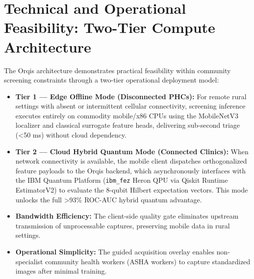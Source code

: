 \documentclass[11pt,a4paper]{report}
\begin{document}
\section{Technical and Operational Feasibility: Two-Tier Compute Architecture}
The Orqis architecture demonstrates practical feasibility within community screening constraints through a two-tier operational deployment model:
\begin{itemize}
  \item \textbf{Tier 1 --- Edge Offline Mode (Disconnected PHCs):} For remote rural settings with absent or intermittent cellular connectivity, screening inference executes entirely on commodity mobile/x86 CPUs using the MobileNetV3 localizer and classical surrogate feature heads, delivering sub-second triage (<50 ms) without cloud dependency.
  \item \textbf{Tier 2 --- Cloud Hybrid Quantum Mode (Connected Clinics):} When network connectivity is available, the mobile client dispatches orthogonalized feature payloads to the Orqis backend, which asynchronously interfaces with the IBM Quantum Platform (\nolinkurl{ibm_fez} Heron QPU via Qiskit Runtime EstimatorV2) to evaluate the 8-qubit Hilbert expectation vectors. This mode unlocks the full >93\% ROC-AUC hybrid quantum advantage.
  \item \textbf{Bandwidth Efficiency:} The client-side quality gate eliminates upstream transmission of unprocessable captures, preserving mobile data in rural settings.
  \item \textbf{Operational Simplicity:} The guided acquisition overlay enables non-specialist community health workers (ASHA workers) to capture standardized images after minimal training.
\end{itemize}
\end{document}
